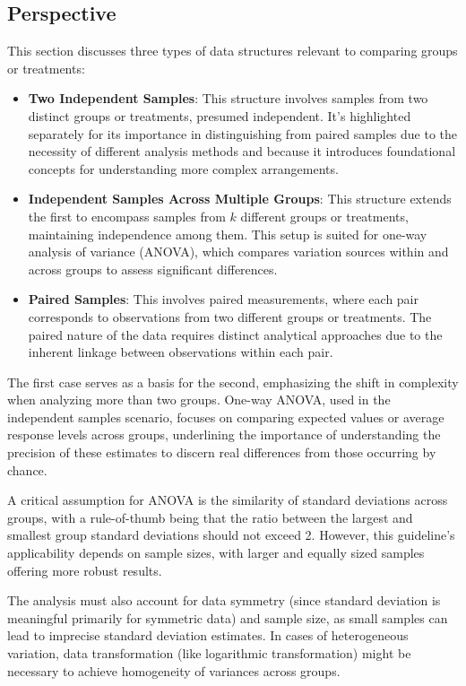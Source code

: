 \documentclass{article}
\begin{document}
\subsection{Perspective}

This section discusses three types of data structures relevant to comparing groups or treatments:

\begin{itemize}
    \item \textbf{Two Independent Samples}: This structure involves samples from two distinct groups or treatments, presumed independent. It's highlighted separately for its importance in distinguishing from paired samples due to the necessity of different analysis methods and because it introduces foundational concepts for understanding more complex arrangements.

    \item \textbf{Independent Samples Across Multiple Groups}: This structure extends the first to encompass samples from $k$ different groups or treatments, maintaining independence among them. This setup is suited for one-way analysis of variance (ANOVA), which compares variation sources within and across groups to assess significant differences.

    \item \textbf{Paired Samples}: This involves paired measurements, where each pair corresponds to observations from two different groups or treatments. The paired nature of the data requires distinct analytical approaches due to the inherent linkage between observations within each pair.
\end{itemize}

The first case serves as a basis for the second, emphasizing the shift in complexity when analyzing more than two groups. One-way ANOVA, used in the independent samples scenario, focuses on comparing expected values or average response levels across groups, underlining the importance of understanding the precision of these estimates to discern real differences from those occurring by chance.

A critical assumption for ANOVA is the similarity of standard deviations across groups, with a rule-of-thumb being that the ratio between the largest and smallest group standard deviations should not exceed 2. However, this guideline's applicability depends on sample sizes, with larger and equally sized samples offering more robust results.

The analysis must also account for data symmetry (since standard deviation is meaningful primarily for symmetric data) and sample size, as small samples can lead to imprecise standard deviation estimates. In cases of heterogeneous variation, data transformation (like logarithmic transformation) might be necessary to achieve homogeneity of variances across groups.
\end{document}
